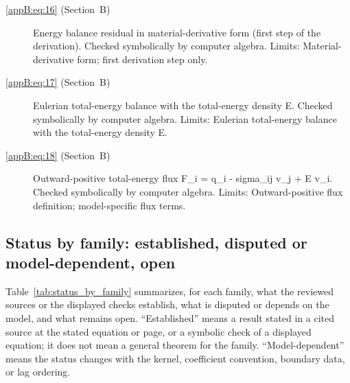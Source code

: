 \begin{description}
  \item[\eqref{appB:eq:16} (Section~B)] Energy balance residual in material-derivative form (first step of the derivation). Checked symbolically by computer algebra. Limits: Material-derivative form; first derivation step only.

  \item[\eqref{appB:eq:17} (Section~B)] Eulerian total-energy balance with the total-energy density E. Checked symbolically by computer algebra. Limits: Eulerian total-energy balance with the total-energy density E.

  \item[\eqref{appB:eq:18} (Section~B)] Outward-positive total-energy flux F\_i = q\_i - sigma\_ij v\_j + E v\_i. Checked symbolically by computer algebra. Limits: Outward-positive flux definition; model-specific flux terms.
\end{description}

\subsection{Status by family: established, disputed or model-dependent, open}
\label{sec:12.3c}

Table~\ref{tab:status_by_family} summarizes, for each family, what the reviewed sources or the displayed checks establish, what is disputed or depends on the model, and what remains open. ``Established'' means a result stated in a cited source at the stated equation or page, or a symbolic check of a displayed equation; it does not mean a general theorem for the family. ``Model-dependent'' means the status changes with the kernel, coefficient convention, boundary data, or lag ordering.


